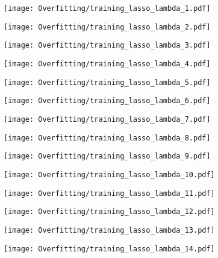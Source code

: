 \documentclass[xcolor=pdftex,dvipsnames,table]{beamer}
\begin{document}
\frame
{
	\begin{center}
		\texttt{[image: Overfitting/training\_lasso\_lambda\_1.pdf]}
	\end{center}
}
\frame
{
	\begin{center}
		\texttt{[image: Overfitting/training\_lasso\_lambda\_2.pdf]}
	\end{center}
}
\frame
{
	\begin{center}
		\texttt{[image: Overfitting/training\_lasso\_lambda\_3.pdf]}
	\end{center}
}
\frame
{
	\begin{center}
		\texttt{[image: Overfitting/training\_lasso\_lambda\_4.pdf]}
	\end{center}
}
\frame
{
	\begin{center}
		\texttt{[image: Overfitting/training\_lasso\_lambda\_5.pdf]}
	\end{center}
}
\frame
{
	\begin{center}
		\texttt{[image: Overfitting/training\_lasso\_lambda\_6.pdf]}
	\end{center}
}
\frame
{
	\begin{center}
		\texttt{[image: Overfitting/training\_lasso\_lambda\_7.pdf]}
	\end{center}
}
\frame
{
	\begin{center}
		\texttt{[image: Overfitting/training\_lasso\_lambda\_8.pdf]}
	\end{center}
}
\frame
{
	\begin{center}
		\texttt{[image: Overfitting/training\_lasso\_lambda\_9.pdf]}
	\end{center}
}
\frame
{
	\begin{center}
		\texttt{[image: Overfitting/training\_lasso\_lambda\_10.pdf]}
	\end{center}
}
\frame
{
	\begin{center}
		\texttt{[image: Overfitting/training\_lasso\_lambda\_11.pdf]}
	\end{center}
}
\frame
{
	\begin{center}
		\texttt{[image: Overfitting/training\_lasso\_lambda\_12.pdf]}
	\end{center}
}
\frame
{
	\begin{center}
		\texttt{[image: Overfitting/training\_lasso\_lambda\_13.pdf]}
	\end{center}
}
\frame
{
	\begin{center}
		\texttt{[image: Overfitting/training\_lasso\_lambda\_14.pdf]}
	\end{center}
}
\end{document}
